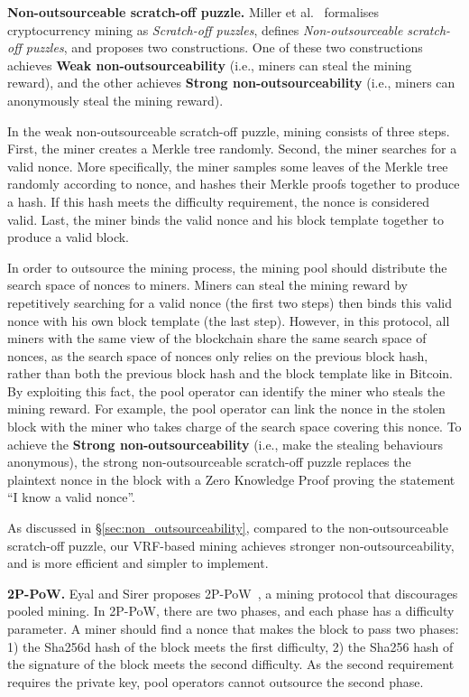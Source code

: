 \textbf{Non-outsourceable scratch-off puzzle.}
Miller et al.~\cite{miller2015nonoutsourceable} formalises cryptocurrency mining as \textit{Scratch-off puzzles}, defines \textit{Non-outsourceable scratch-off puzzles}, and proposes two constructions.
One of these two constructions achieves \textbf{Weak non-outsourceability} (i.e., miners can steal the mining reward), and the other achieves \textbf{Strong non-outsourceability} (i.e., miners can anonymously steal the mining reward).

In the weak non-outsourceable scratch-off puzzle, mining consists of three steps.
First, the miner creates a Merkle tree randomly.
Second, the miner searches for a valid nonce.
More specifically, the miner samples some leaves of the Merkle tree randomly according to nonce, and hashes their Merkle proofs together to produce a hash.
If this hash meets the difficulty requirement, the nonce is considered valid.
Last, the miner binds the valid nonce and his block template together to produce a valid block.

In order to outsource the mining process, the mining pool should distribute the search space of nonces to miners.
Miners can steal the mining reward by repetitively searching for a valid nonce (the first two steps) then binds this valid nonce with his own block template (the last step).
However, in this protocol, all miners with the same view of the blockchain share the same search space of nonces, as the search space of nonces only relies on the previous block hash, rather than both the previous block hash and the block template like in Bitcoin.
By exploiting this fact, the pool operator can identify the miner who steals the mining reward.
For example, the pool operator can link the nonce in the stolen block with the miner who takes charge of the search space covering this nonce.
To achieve the \textbf{Strong non-outsourceability} (i.e., make the stealing behaviours anonymous), the strong non-outsourceable scratch-off puzzle replaces the plaintext nonce in the block with a Zero Knowledge Proof proving the statement ``I know a valid nonce''.

As discussed in \S\ref{sec:non_outsourceability}, compared to the non-outsourceable scratch-off puzzle, our VRF-based mining achieves stronger non-outsourceability, and is more efficient and simpler to implement.

\textbf{2P-PoW.}
Eyal and Sirer proposes 2P-PoW~\cite{2P-PoW}, a mining protocol that discourages pooled mining.
In 2P-PoW, there are two phases, and each phase has a difficulty parameter.
A miner should find a nonce that makes the block to pass two phases: 1) the Sha256d hash of the block meets the first difficulty, 2) the Sha256 hash of the signature of the block meets the second difficulty.
As the second requirement requires the private key, pool operators cannot outsource the second phase.

